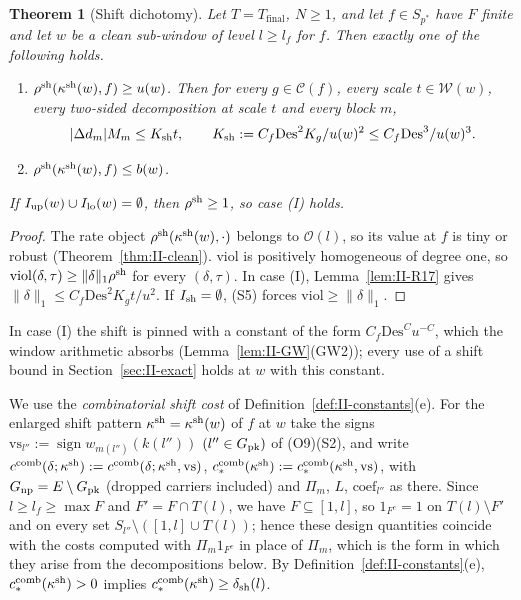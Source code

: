 \documentclass[10pt]{amsart}
\newtheorem{theorem}{Theorem}[section]
\theoremstyle{definition}
\theoremstyle{remark}
\newcommand{\sgn}{\operatorname{sign}}
\newcommand{\Cset}{\mathcal C}
\begin{document}
\begin{theorem}[Shift dichotomy]\label{thm:II-C1}
Let $T=T_{\mathrm{final}}$, $N\ge1$, and let $f\in S_{p^*}$ have $F$ finite and let $w$ be a clean sub-window of
level $l\ge l_f$ for $f$.  Then exactly one of the following holds.
\begin{enumerate}
\item[(I)] $\rho^{\rm sh}(\kappa^{\rm sh}(w),f)\ge u(w)$.  Then for every
$g\in\Cset(f)$, every scale $t\in\mathcal W(w)$, every two-sided
decomposition at scale $t$ and every block $m$,
\[
 |\Delta d_m|M_m\le K_{\rm sh}t,\qquad K_{\rm sh}:=C_f\mathrm{Des}^2K_g/u(w)^2
 \le C_f\mathrm{Des}^3/u(w)^3 .
\]
\item[(II)] $\rho^{\rm sh}(\kappa^{\rm sh}(w),f)\le b(w)$.
\end{enumerate}
If $I_{\rm up}(w)\cup I_{\rm lo}(w)=\emptyset$, then $\rho^{\rm sh}\ge1$, so
case \textup{(I)} holds.
\end{theorem}

\begin{proof}
The rate object $\rho^{\rm sh}(\kappa^{\rm sh}(w),\cdot)$ belongs to
$\mathcal O(l)$, so its value at $f$ is tiny or robust
(Theorem~\ref{thm:II-clean}).  $\mathrm{viol}$ is positively homogeneous of
degree one, so $\mathrm{viol}(\delta,\tau)\ge\|\delta\|_1\rho^{\rm sh}$ for every
$(\delta,\tau)$.  In case (I), Lemma~\ref{lem:II-R17} gives $\|\delta\|_1\le
C_f\mathrm{Des}^2K_gt/u^2$.  If $I_{\rm sh}=\emptyset$, (S5) forces
$\mathrm{viol}\ge\|\delta\|_1$.
\end{proof}

In case (I) the shift is pinned with a constant of the form $C_f\mathrm{Des}^C
u^{-C}$, which the window arithmetic absorbs (Lemma~\ref{lem:II-GW}(GW2));
every use of a shift bound in Section~\ref{sec:II-exact} holds at $w$ with
this constant.

\smallskip
We use the \emph{combinatorial shift cost} of
Definition~\ref{def:II-constants}(e).  For the enlarged shift pattern
$\kappa^{\rm sh}=\kappa^{\rm sh}(w)$ of $f$ at $w$ take the signs
$\mathrm{vs}_{l''}:=\sgn w_{m(l'')}(k(l''))$ $(l''\in G_{\rm pk})$ of
(O9)(S2), and write $c^{\rm comb}(\delta;\kappa^{\rm sh}):=c^{\rm comb}(\delta;
\kappa^{\rm sh},\mathrm{vs})$, $c^{\rm comb}_*(\kappa^{\rm sh}):=c^{\rm
comb}_*(\kappa^{\rm sh},\mathrm{vs})$, with $G_{\rm np}=E\setminus G_{\rm
pk}$ (dropped carriers included) and $\Pi_m$, $L$, $\mathrm{coef}_{l''}$ as
there.  Since $l\ge l_f\ge\max F$ and $F'=F\cap T(l)$, we have
$F\subseteq[1,l]$, so $1_{F^c}=1$ on $T(l)\setminus F'$ and on every set
$S_{l''}\setminus([1,l]\cup T(l))$; hence these design quantities coincide
with the costs computed with $\Pi_m1_{F^c}$ in place of $\Pi_m$, which is
the form in which they arise from the decompositions below.  By
Definition~\ref{def:II-constants}(e), $c^{\rm comb}_*(\kappa^{\rm sh})>0$
implies $c^{\rm comb}_*(\kappa^{\rm sh})\ge\delta_{\rm sh}(l)$.
\end{document}
